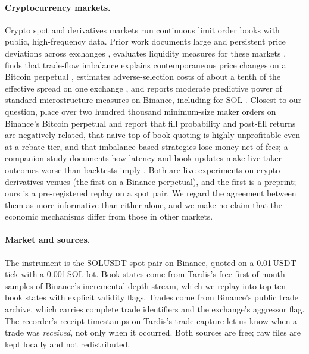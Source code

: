 \documentclass[11pt]{article}
\makeatletter
\renewcommand\section{\@startsection{section}{1}{\z@}{-3.25ex\@plus -1ex \@minus -.2ex}{1.5ex \@plus .2ex}{\normalfont\large\bfseries}}
\makeatother
\begin{document}
\paragraph{Cryptocurrency markets.} Crypto spot and derivatives markets run continuous limit order books with public,
high-frequency data. Prior work documents large and persistent price deviations across exchanges \citep{makarov2020},
evaluates liquidity measures for these markets \citep{brauneis2021}, finds that trade-flow imbalance explains
contemporaneous price changes on a Bitcoin perpetual \citep{silantyev2019}, estimates adverse-selection costs of about a
tenth of the effective spread on one exchange \citep{tinic2023}, and reports moderate predictive power of standard
microstructure measures on Binance, including for SOL \citep{easley2026}. Closest to our question, \citet{albers2025dilemma}
place over two hundred thousand minimum-size maker orders on Binance's Bitcoin perpetual and report that fill probability
and post-fill returns are negatively related, that naive top-of-book quoting is highly unprofitable even at a rebate tier,
and that imbalance-based strategies lose money net of fees; a companion study documents how latency and book updates
make live taker outcomes worse than backtests imply \citep{albers2025latency}. Both are live experiments on crypto derivatives venues (the first
on a Binance perpetual), and the first is a preprint; ours is a pre-registered replay on a spot pair. We regard the agreement between them as more informative than either alone, and we make no claim that the
economic mechanisms differ from those in other markets.

\section{Data and sample}\label{sec:data}

\paragraph{Market and sources.} The instrument is the SOLUSDT spot pair on Binance, quoted on a 0.01\,USDT tick with a
0.001\,SOL lot. Book states come from Tardis's free first-of-month samples of Binance's incremental depth stream, which
we replay into top-ten book states with explicit validity flags. Trades come from Binance's public trade archive, which
carries complete trade identifiers and the exchange's aggressor flag. The recorder's receipt timestamps on Tardis's
trade capture let us know when a trade was \emph{received}, not only when it occurred. Both sources are free; raw files
are kept locally and not redistributed.
\end{document}
